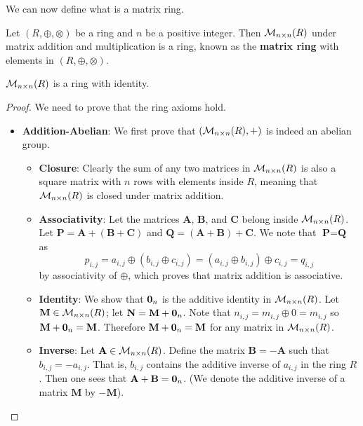 We can now define what is a matrix ring.
\begin{definition}
    Let $(R, \oplus, \otimes)$ be a ring and $n$ be a positive integer. Then $\mathcal{M}_{n\times n}(R)$ under matrix addition and multiplication is a ring, known as the \textbf{matrix ring} with elements in $(R, \oplus, \otimes)$.
\end{definition}
\begin{proposition}
    $\mathcal{M}_{n\times n}(R)$ is a ring with identity.
\end{proposition}
\begin{proof}
    We need to prove that the ring axioms hold.
    \begin{itemize}
        \item \textbf{Addition-Abelian}: We first prove that $(\mathcal{M}_{n\times n}(R), +)$ is indeed an abelian group.
        \begin{itemize}
            \item \textbf{Closure}: Clearly the sum of any two matrices in $\mathcal{M}_{n\times n}(R)$ is also a square matrix with $n$ rows with elements inside $R$, meaning that $\mathcal{M}_{n\times n}(R)$ is closed under matrix addition.

            \item \textbf{Associativity}: Let the matrices $\textbf{A}$, $\textbf{B}$, and $\textbf{C}$ belong inside $\mathcal{M}_{n\times n}(R)$. Let $\textbf{P} = \textbf{A} + (\textbf{B} + \textbf{C})$ and $\textbf{Q} = (\textbf{A} + \textbf{B}) + \textbf{C}$. We note that $\textbf{P} = \textbf{Q}$ as
            \[
                p_{i,j} = a_{i,j} \oplus (b_{i,j} \oplus c_{i,j}) = (a_{i,j} \oplus b_{i,j}) \oplus c_{i,j} = q_{i,j}
            \]
            by associativity of $\oplus$, which proves that matrix addition is associative.
    
            \item \textbf{Identity}: We show that $\textbf{0}_{n}$ is the additive identity in $\mathcal{M}_{n\times n}(R)$. Let $\textbf{M} \in \mathcal{M}_{n\times n}(R)$; let $\textbf{N} = \textbf{M} + \textbf{0}_{n}$. Note that $n_{i,j} = m_{i,j} \oplus 0 = m_{i,j}$ so $\textbf{M} + \textbf{0}_{n} = \textbf{M}$. Therefore $\textbf{M} + \textbf{0}_{n} = \textbf{M}$ for any matrix in $\mathcal{M}_{n\times n}(R)$.
            
            \item \textbf{Inverse}: Let $\textbf{A} \in \mathcal{M}_{n\times n}(R)$. Define the matrix $\textbf{B} = -\textbf{A}$ such that $b_{i,j} = -a_{i,j}$. That is, $b_{i,j}$ contains the additive inverse of $a_{i,j}$ in the ring $R$. Then one sees that $\textbf{A} + \textbf{B} = \textbf{0}_{n}$. (We denote the additive inverse of a matrix $\textbf{M}$ by $-\textbf{M}$).


\end{itemize}
\end{itemize}
\end{proof}
